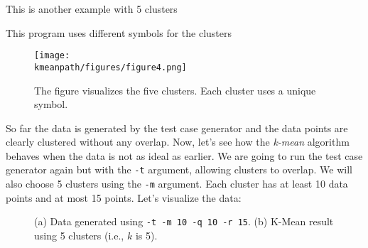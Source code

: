 This is another example with 5 clusters

\begin{minipage}[t]{0.4\textwidth}
\resetlinenumber[1]
\linenumbers
\begin{tt}
  
\end{tt}
\nolinenumbers
\end{minipage}
\begin{minipage}[t]{0.4\textwidth}
\resetlinenumber[1]
\linenumbers
\begin{tt}
  
\end{tt}
\nolinenumbers
\end{minipage}

This program uses different symbols for the clusters

\resetlinenumber[1]
\linenumbers
\begin{tt}
  
\end{tt}
\nolinenumbers


\clearpage

\begin{figure}[h] \centering
{\texttt{[image: \\kmeanpath/figures/figure4.png]}}
\caption{The figure visualizes the five clusters. Each cluster
uses a unique symbol.}
\label{fig:kmean:clusters}
\end{figure}

\clearpage

So far the data is generated by the test case generator and the data
points are clearly clustered without any overlap.  Now, let's see how
the {\it k-mean} algorithm behaves when the data is not as ideal as
earlier.  We are going to run the test case generator again but with
the {\tt -t} argument, allowing clusters to overlap.  We will also
choose 5 clusters using the {\tt -m} argument.  Each cluster has
at least 10 data points and at most 15 points.
Let's visualize the data:


\begin{figure}[h] \centering
\caption{(a) Data generated using {\tt -t -m 10 -q 10 -r 15}.
(b) K-Mean result using 5 clusters (i.e., $k$ is 5). }
\label{fig:kmean:cluster5}
\end{figure}

